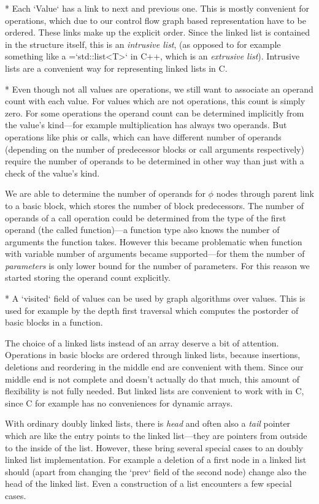 * Each `Value` has a link to next and previous one. This is mostly convenient
for operations, which due to our control flow graph based representation have to
be ordered. These links make up the explicit order. Since the linked list is
contained in the structure itself, this is an {\em intrusive list}, (as
opposed to for example something like a {\everyintt={}`std::list<T>`} in C++,
which is an {\em extrusive list}). Intrusive lists are a convenient way for
representing linked lists in C.

* Even though not all values are operations, we still want to associate an
operand count with each value. For values which are not operations, this count
is simply zero. For some operations the operand count can be determined
implicitly from the value's kind---for example multiplication has
always two operands. But operations like phis or calls, which can have
different number of operands (depending on the number of predecessor blocks or
call arguments respectively) require the number of operands to be determined in
other way than just with a check of the value's kind.

We are able to determine the number of operands for $\phi$ nodes
through parent link to a basic block, which stores the number of block
predecessors. The number of operands of a call operation could be determined from the
type of the first operand (the called function)---a function type also knows the
number of arguments the function takes. However this became problematic when
function with variable number of arguments became supported---for them the
number of {\em parameters} is only lower bound for the number of parameters. For
this reason we started storing the operand count explicitly.

* A `visited` field of values can be used by graph algorithms over values. This
is used for example by the depth first traversal which computes the postorder
of basic blocks in a function.
\enditems

The choice of a linked lists instead of an array deserve a bit of attention.
Operations in basic blocks are ordered through linked lists, because insertions,
deletions and reordering in the middle end are convenient with them. Since our
middle end is not complete and doesn't actually do that much, this amount of
flexibility is not fully needed. But linked lists are convenient to work with in C,
since C for example has no conveniences for dynamic arrays.

With ordinary doubly linked lists, there is {\em head} and often also a {\em
tail} pointer which are like the entry points to the linked list---they are
pointers from outside to the inside of the list. However, these bring several special
cases to an doubly linked list implementation. For example a deletion of a first
node in a linked list should (apart from changing the `prev` field of the second
node) change also the head of the linked list. Even a construction of a list
encounters a few special cases.

